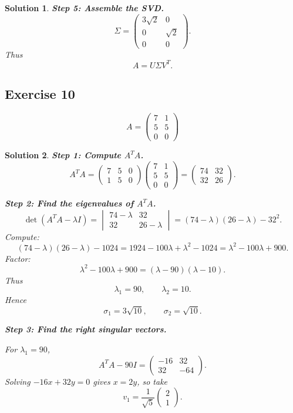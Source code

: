 \documentclass[11pt,a4paper]{article}
\theoremstyle{sol}
\newtheorem*{solution}{Solution}
\begin{document}
\begin{solution}
\textbf{Step 5: Assemble the SVD.}
\[
\Sigma=
\begin{pmatrix}
3\sqrt2&0\\
0&\sqrt2\\
0&0
\end{pmatrix}.
\]
Thus
\[
\boxed{
A=U\Sigma V^T.
}
\]
\end{solution}

\clearpage
\subsection*{Exercise 10}
\[
A=\begin{pmatrix}7&1\\5&5\\0&0\end{pmatrix}
\]

\begin{solution}
\textbf{Step 1: Compute $A^TA$.}
\[
A^TA=
\begin{pmatrix}
7&5&0\\
1&5&0
\end{pmatrix}
\begin{pmatrix}
7&1\\
5&5\\
0&0
\end{pmatrix}
=
\begin{pmatrix}
74&32\\
32&26
\end{pmatrix}.
\]

\textbf{Step 2: Find the eigenvalues of $A^TA$.}
\[
\det(A^TA-\lambda I)
=
\begin{vmatrix}
74-\lambda&32\\
32&26-\lambda
\end{vmatrix}
=(74-\lambda)(26-\lambda)-32^2.
\]
Compute:
\[
(74-\lambda)(26-\lambda)-1024
=1924-100\lambda+\lambda^2-1024
=\lambda^2-100\lambda+900.
\]
Factor:
\[
\lambda^2-100\lambda+900=(\lambda-90)(\lambda-10).
\]
Thus
\[
\lambda_1=90,\qquad \lambda_2=10.
\]
Hence
\[
\sigma_1=3\sqrt{10},\qquad \sigma_2=\sqrt{10}.
\]

\textbf{Step 3: Find the right singular vectors.}

For $\lambda_1=90$,
\[
A^TA-90I=
\begin{pmatrix}
-16&32\\
32&-64
\end{pmatrix}.
\]
Solving $-16x+32y=0$ gives $x=2y$, so take
\[
v_1=\frac{1}{\sqrt5}\begin{pmatrix}2\\1\end{pmatrix}.
\]


\end{solution}
\end{document}
